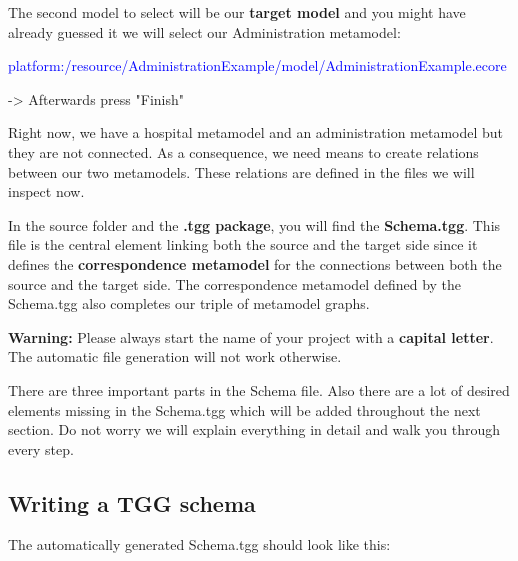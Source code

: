 The second model to select will be our \textbf{target model} and you might have already guessed it we will select our Administration metamodel: \newline

\centering

\textcolor{Blue}{\textsf{platform:/resource/AdministrationExample/model/AdministrationExample.ecore}}\newline

-> Afterwards press \textsf{"Finish"}\newline

\raggedright

Right now, we have a hospital metamodel and an administration metamodel but they are not connected. As a consequence, we need means to create relations between our two metamodels. These relations are defined in the files we will inspect now.

In the source folder and the \textbf{.tgg package}, you will find the \textbf{Schema.tgg}. This file is the central element linking both the source and the target side since it defines the \textbf{correspondence metamodel} for the connections between both the source and the target side. The correspondence metamodel defined by the Schema.tgg also completes our triple of metamodel graphs.\newline

\textbf{Warning:} Please always start the name of your project with a \textbf{capital letter}. The automatic file generation will not work otherwise.\newline

There are three important parts in the Schema file. Also there are a lot of desired elements missing in the Schema.tgg which will be added throughout the next section. Do not worry we will explain everything in detail and walk you through every step.
\clearpage

\subsection{Writing a TGG schema}

The automatically generated Schema.tgg should look like this:\newline

